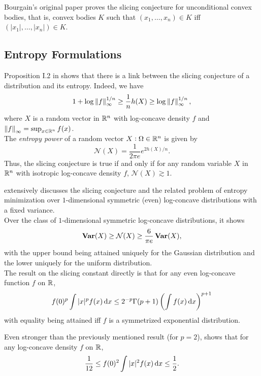 \documentclass{article}
\begin{document}
	Bourgain's original paper \cite{bourgain-slicing} proves the slicing conjecture for unconditional convex bodies, that is, convex bodies $K$ such that $(x_1,\ldots,x_n) \in K$ iff $(|x_1|,\ldots,|x_n|) \in K$.
	
	\subsection{Entropy Formulations}

		Proposition I.2 in \cite{entropy-slicing} shows that there is a link between the slicing conjecture of a distribution and its entropy. Indeed, we have
		\begin{equation}
			1 + \log \left\lVert f\right\rVert_\infty^{1/n} \geq \frac{1}{n} h(X) \geq \log \left\lVert f\right\rVert_\infty^{1/n},
		\end{equation}
		where $X$ is a random vector in $\mathbb{R}^n$ with log-concave density $f$ and $\left\lVert f\right\rVert_\infty = \sup_{x \in \mathbb{R}^n} f(x)$.\\
		The \emph{entropy power} of a random vector $X : \Omega \in \mathbb{R}^n$ is given by
			\[ \mathcal{N}(X) = \frac{1}{2\pi e} e^{2h(X)/n}. \]
		Thus, the slicing conjecture is true if and only if for any random variable $X$ in $\mathbb{R}^n$ with isotropic log-concave density $f$, $\mathcal{N}(X) \gtrsim 1$.

		\cite{entropy-bound-1D-slicing} extensively discusses the slicing conjecture and the related problem of entropy minimization over $1$-dimensional symmetric (even) log-concave distributions with a fixed variance.\\
		Over the class of $1$-dimensional symmetric log-concave distributions, it shows
			\[ \operatorname{\textbf{Var}}(X) \ge \mathcal{N}(X) \geq \frac{6}{\pi e}\operatorname{\textbf{Var}}(X), \]
		with the upper bound being attained uniquely for the Gaussian distribution and the lower uniquely for the uniform distribution. \\
		The result on the slicing constant directly is that for any even log-concave function $f$ on $\mathbb{R}$,
			\[ f(0)^p \int |x|^p f(x) \dif x \le 2^{-p} \Gamma(p+1) \left( \int f(x) \dif x \right)^{p+1} \]
		with equality being attained iff $f$ is a symmetrized exponential distribution.
		

		Even stronger than the previously mentioned result (for $p=2$), \cite{Fradelizi1999} shows that for any log-concave density $f$ on $\mathbb{R}$,
		\begin{equation}
			\label{eqn: fradelizi 1-D optimal}
			\frac{1}{12} \le f(0)^2 \int |x|^2 f(x) \dif x \le \frac{1}{2}.
		\end{equation}
\end{document}
